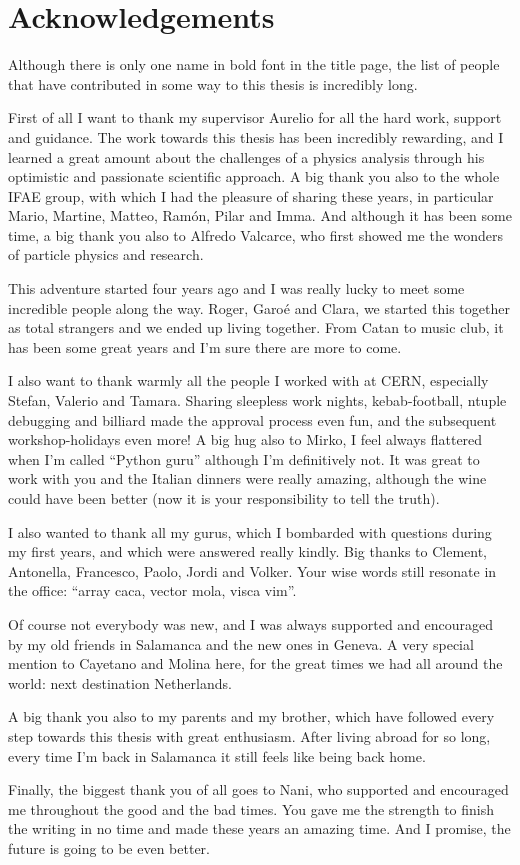 \chapter*{Acknowledgements}
    \label{Acknowledgements}

Although there is only one name in bold font in the title page, the list of people that have contributed in some way to this thesis is incredibly long. 

First of all I want to thank my supervisor Aurelio for all the hard work, support and guidance. 
The work towards this thesis has been incredibly rewarding, and I learned a great amount about the challenges of a physics analysis through
his optimistic and passionate scientific approach.
A big thank you also to the whole IFAE group, with which I had the pleasure of sharing these years, in particular Mario, Martine, Matteo, Ram\'{o}n, Pilar and Imma.
And although it has been some time, a big thank you also to Alfredo Valcarce, who first showed me the wonders of particle physics and research.

This adventure started four years ago and I was really lucky to meet some incredible people along the way. 
Roger, Garo\'{e} and Clara, we started this together as total strangers and we ended up living together. From Catan to music club, it has been some great years and I'm sure there are more to come. 

I also want to thank warmly all the people I worked with at CERN, especially Stefan, Valerio and Tamara. Sharing sleepless work nights, kebab-football, ntuple debugging and billiard made the approval process even fun, and the subsequent workshop-holidays even more!
A big hug also to Mirko, I feel always flattered when I'm called ``Python guru'' although I'm definitively not. It was great to work with you and the Italian dinners were really amazing, although the wine could have been better (now it is your responsibility to tell the truth).

I also wanted to thank all my gurus, which I bombarded with questions during my first years, and which were answered really kindly. 
Big thanks to  Clement, Antonella, Francesco, Paolo, Jordi and Volker. Your wise words still resonate in the office: ``array caca, vector mola, visca vim''.

Of course not everybody was new, and I was always supported and encouraged by my old friends in Salamanca and the new ones in Geneva. A very special mention to
Cayetano and Molina here, for the great times we had all around the world: next destination Netherlands.

A big thank you also to my parents and my brother, which have followed every step towards this thesis with great enthusiasm. After living abroad for so long, every time I'm back in Salamanca it still feels like being back home.

Finally, the biggest thank you of all goes to Nani, who supported and encouraged me throughout the good and the bad times. You gave me the strength to finish the writing in no time and made these years an amazing time. And I promise, the future is going to be even better.
